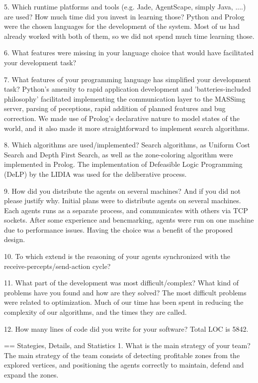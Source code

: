 5. Which runtime platforms and tools (e.g. Jade, AgentScape, simply Java,
....) are used? How much time did you invest in learning those?  Python and
Prolog were the chosen languages for the development of the system. Most of us
had already worked with both of them, so we did not spend much time learning
those.

6. What features were missing in your language choice that would have
facilitated your development task?


7. What features of your programming language has simplified your development
task?  Python's amenity to rapid application development and
'batteries-included philosophy' facilitated implementing the communication
layer to the MASSimg server, parsing of peceptions, rapid addition of planned
features and bug correction.  We made use of Prolog's declarative nature to
model states of the world, and it also made it more straightforward to
implement search algorithms.


8. Which algorithms are used/implemented?  Search algorithms, as Uniform Cost
Search and Depth First Search, as well as the zone-coloring algorithm were
implemented in Prolog.  The implementation of Defeasible Logic Programming
(DeLP) by the LIDIA was used for the deliberative process.

9. How did you distribute the agents on several machines? And if you did not
please justify why.  Initial plans were to distribute agents on several
machines. Each agents runs as a separate process, and communicates with others
via TCP sockets. After some experience and bencmarking, agents were run on one
machine due to performance issues. Having the choice was a benefit of the
proposed design.

10. To which extend is the reasoning of your agents synchronized with the
receive-percepts/send-action cycle?


11. What part of the development was most difficult/complex? What kind of
problems have you found and how are they solved?  The most difficult problems
were related to optimization. Much of our time has been spent in reducing the
complexity of our algorithms, and the times they are called.

12. How many lines of code did you write for your software?  Total LOC is
5842.

== Stategies, Details, and Statistics
1. What is the main strategy of your
team?  The main strategy of the team consists of detecting profitable zones
from the explored vertices, and positioning the agents correctly to maintain,
defend and expand the zones.

